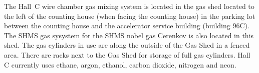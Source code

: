 
The Hall~C wire chamber gas mixing system is located in the gas shed located
to the left of the counting house (when facing the counting house)
in the parking lot between the counting house
and the accelerator service building (building 96C).  The SHMS gas sysystem for
the SHMS nobel gas Cerenkov is also located in this shed.
The gas cylinders in use are along the outside of the Gas Shed
in a fenced area. There are racks next to the Gas Shed for storage
of full gas cylinders.  Hall C currently uses ethane, argon, ethanol,
carbon dioxide, nitrogen and neon.

